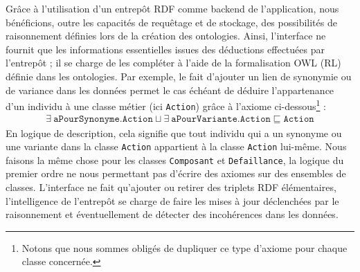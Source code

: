 %
Grâce à l'utilisation d'un entrepôt RDF comme backend de l'application, nous bénéficions, outre les capacités de requêtage et de stockage, des possibilités de raisonnement définies lors de la création des ontologies. Ainsi, l'interface ne fournit que les informations essentielles issues des déductions effectuées par l'entrepôt ; il se charge de les compléter à l'aide de la formalisation OWL (RL)\cite{owlprofiles} définie dans les ontologies. Par exemple, le fait d'ajouter un lien de synonymie ou de variance dans les données permet le cas échéant de déduire l'appartenance d'un individu à une classe métier (ici \texttt{Action}) grâce à l'axiome ci-dessous\footnote{Notons que nous sommes obligés de dupliquer ce type d'axiome pour chaque classe concernée.
} :
$$
\begin{array}{ll}
\exists  \ \texttt{aPourSynonyme} .  \texttt {Action}  \sqcup \exists  \ \texttt{aPourVariante} .  \texttt {Action}
\sqsubseteq    \texttt{Action}
\end{array}
$$
En logique de description, cela signifie que tout individu qui a un synonyme ou une variante dans la classe \texttt{Action} appartient à la classe \texttt{Action} lui-même. Nous faisons la même chose pour les classes \texttt{Composant} et \texttt{Defaillance}, la logique du premier ordre ne nous permettant pas d'écrire des axiomes sur des ensembles de classes.
L'interface ne fait qu'ajouter ou retirer des triplets RDF élémentaires, l'intelligence de l'entrepôt se charge de faire les mises à jour déclenchées par le raisonnement et éventuellement de détecter des incohérences dans les données.
